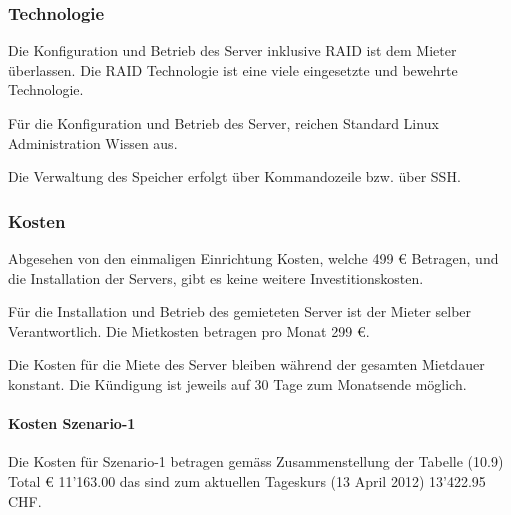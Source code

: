 \subsubsection{Technologie}
Die Konfiguration und Betrieb des Server inklusive RAID ist dem Mieter überlassen. Die RAID Technologie ist eine viele eingesetzte und bewehrte Technologie.

Für die Konfiguration und Betrieb des Server, reichen Standard Linux Administration Wissen aus.

Die Verwaltung des Speicher erfolgt über Kommandozeile bzw. über \gls{SSH}.

\subsubsection{Kosten}
Abgesehen von den einmaligen Einrichtung Kosten, welche 499 € Betragen, und die Installation der Servers, gibt es keine weitere Investitionskosten. 

Für die Installation und Betrieb des gemieteten Server ist der Mieter selber Verantwortlich. Die Mietkosten betragen pro Monat 299 €.

Die Kosten für die Miete des Server bleiben während der gesamten Mietdauer konstant. Die Kündigung ist jeweils auf 30 Tage zum Monatsende möglich. 

\paragraph*{Kosten Szenario-1}
Die Kosten für Szenario-1 betragen gemäss Zusammenstellung der Tabelle (10.9) Total € 11'163.00 das sind zum aktuellen Tageskurs (13 April 2012) 13'422.95 CHF.

